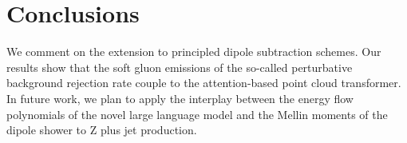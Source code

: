 \section{Conclusions}\label{sec:conclusions}

We comment on the extension to principled dipole subtraction schemes.
Our results show that the soft gluon emissions of the so-called
perturbative background rejection rate couple to the attention-based
point cloud transformer. In future work, we plan to apply the interplay
between the energy flow polynomials of the novel large language model
and the Mellin moments of the dipole shower to Z plus jet production.

